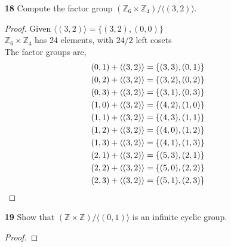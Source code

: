 \documentclass[paper=usletter, fontsize=12pt]{article}
\begin{document}
\begin{itemize}
\begin{enumerate}
\begin{proof}
            \end{proof}

            \item[\textbf{18}] Compute the factor group $(\mathbb{Z}_6 \times
            \mathbb{Z}_4)/ \langle(3,2)\rangle$.
            \begin{proof}

                Given $\langle(3,2)\rangle = \{(3,2),(0,0)\}$\\
                $\mathbb{Z}_6 \times \mathbb{Z}_4$ has 24 elements, with $24/2$
                left cosets\\
                The factor groups are,
                \begin{align*}
                    (0,1) + \langle(3,2)\rangle & = \{(3,3),(0,1)\} \\
                    (0,2) + \langle(3,2)\rangle & = \{(3,2),(0,2)\} \\
                    (0,3) + \langle(3,2)\rangle & = \{(3,1),(0,3)\} \\
                    (1,0) + \langle(3,2)\rangle & = \{(4,2),(1,0)\} \\
                    (1,1) + \langle(3,2)\rangle & = \{(4,3),(1,1)\} \\
                    (1,2) + \langle(3,2)\rangle & = \{(4,0),(1,2)\} \\
                    (1,3) + \langle(3,2)\rangle & = \{(4,1),(1,3)\} \\
                    (2,1) + \langle(3,2)\rangle & = \{(5,3),(2,1)\} \\
                    (2,2) + \langle(3,2)\rangle & = \{(5,0),(2,2)\} \\
                    (2,3) + \langle(3,2)\rangle & = \{(5,1),(2,3)\} \qedhere
                \end{align*}

            \end{proof}

            \item[\textbf{19}] Show that $(\mathbb{Z} \times \mathbb{Z})/
            \langle(0,1)\rangle$ is an infinite cyclic group.
            \begin{proof}


\end{proof}
\end{enumerate}
\end{itemize}
\end{document}
